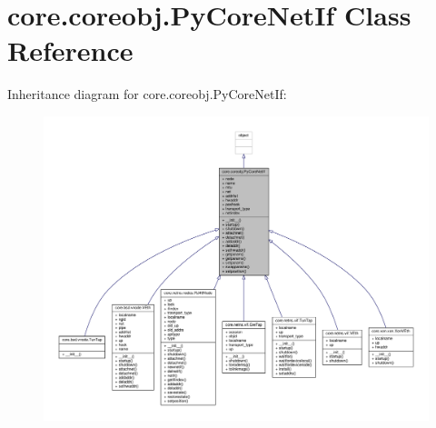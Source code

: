 \hypertarget{classcore_1_1coreobj_1_1_py_core_net_if}{\section{core.\+coreobj.\+Py\+Core\+Net\+If Class Reference}
\label{classcore_1_1coreobj_1_1_py_core_net_if}
}


Inheritance diagram for core.\+coreobj.\+Py\+Core\+Net\+If\+:
\nopagebreak
\begin{figure}[H]
\begin{center}
\leavevmode
\includegraphics[width=350pt]{classcore_1_1coreobj_1_1_py_core_net_if__inherit__graph}
\end{center}
\end{figure}


